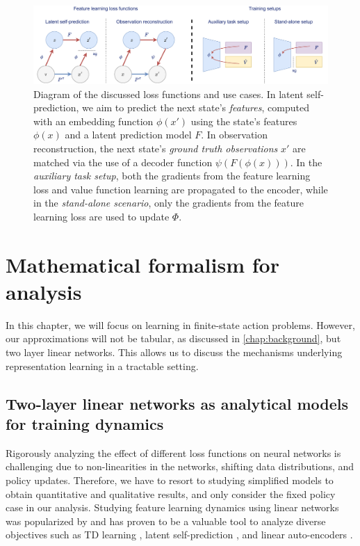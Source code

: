 \begin{figure}
    \centering
    \includegraphics[width=\textwidth]{illustrations/understanding/all_in_one_repeat.pdf}
    \caption{Diagram of the discussed loss functions and use cases. In latent self-prediction, we aim to predict the next state's \emph{features}, computed with an embedding function $\phi(x')$ using the state's features $\phi(x)$ and a latent prediction model $F$. In observation reconstruction, the next state's \emph{ground truth observations} $x'$ are matched via the use of a decoder function $\psi(F(\phi(x)))$. In the \emph{auxiliary task setup}, both the gradients from the feature learning loss and value function learning are propagated to the encoder, while in the \emph{stand-alone scenario}, only the gradients from the feature learning loss are used to update $\Phi$.}
    \label{fig:understanding:losses}
\end{figure}

\section{Mathematical formalism for analysis}
In this chapter, we will focus on learning in finite-state action problems.
However, our approximations will not be tabular, as discussed in \autoref{chap:background}, but two layer linear networks.
This allows us to discuss the mechanisms underlying representation learning in a tractable setting.

\subsection{Two-layer linear networks as analytical models for training dynamics}
\label{sec:understanding:background}

Rigorously analyzing the effect of different loss functions on neural networks is challenging due to non-linearities in the networks, shifting data distributions, and policy updates.
Therefore, we have to resort to studying simplified models to obtain quantitative and qualitative results, and only consider the fixed policy case in our analysis.
Studying feature learning dynamics using linear networks was popularized by \textcite{saxe2014exact} and has proven to be a valuable tool to analyze diverse objectives such as TD learning \parencite{tang2023towards,lelan2023bootstrapped}, latent self-prediction \parencite{tian2021understanding,tang2022understanding}, and linear auto-encoders \parencite{pretorius2018learning,bao2020regularized}.

